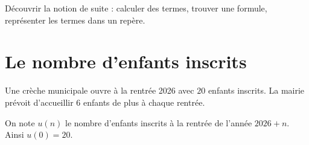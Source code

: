 \documentclass[12pt,a4paper]{article}
\begin{document}
\pagestyle{fancy}

\fancyhf{} %
\fancyhead[R]{ {\small \Niveau}}
\fancyhead[L]{ {\small \ChapitreCourt}}
\fancyhead[C]{ {\small \Document}}
\fancyfoot[R]{{\small \thepage\  / \pageref{LastPage}}}

\newcommand{\repere}[2]{%
\begin{center}
\begin{tikzpicture}
\begin{axis}[
  width=\linewidth, height=5.8cm,
  xmin=-0.5, xmax=7.5, ymin=0, ymax=#2,
  xtick={0,...,7}, ytick distance=10, minor y tick num=1,
  grid=both, major grid style={gray!45}, minor grid style={gray!20},
  axis lines=left, xlabel={$n$}, ylabel={#1},
  ylabel style={font=\small}, xlabel style={at={(1,0)}, anchor=west},
  ]
\end{axis}
\end{tikzpicture}
\end{center}}

\setlength{\parindent}{0pt}
\newcommand{\trou}[1]{\underline{\hspace{#1}}}

\begin{objectif}
Découvrir la notion de suite : calculer des termes, trouver une formule, représenter les termes dans un repère.
\end{objectif}

\section*{Le nombre d'enfants inscrits}
Une crèche municipale ouvre à la rentrée 2026 avec $20$ enfants inscrits. La mairie prévoit d'accueillir $6$ enfants de plus à chaque rentrée.

On note $u(n)$ le nombre d'enfants inscrits à la rentrée de l'année $2026+n$. Ainsi $u(0)=20$.
\end{document}
